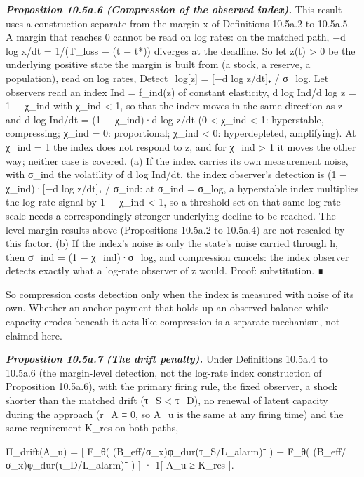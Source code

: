 \documentclass[
]{article}
\begin{document}
\emph{\textbf{Proposition 10.5a.6 (Compression of the observed index).}}
This result uses a construction separate from the margin x of
Definitions 10.5a.2 to 10.5a.5. A margin that reaches 0 cannot be read
on log rates: on the matched path, −d log x/dt = 1/(T\_loss − (t − t*))
diverges at the deadline. So let z(t) \textgreater{} 0 be the underlying
positive state the margin is built from (a stock, a reserve, a
population), read on log rates, Detect\_log{[}z{]} = {[}−d log z/dt{]}₊
/ σ\_log. Let observers read an index Ind = f\_ind(z) of constant
elasticity, d log Ind/d log z = 1 − χ\_ind with χ\_ind \textless{} 1, so
that the index moves in the same direction as z and d log Ind/dt = (1 −
χ\_ind)·d log z/dt (0 \textless{} χ\_ind \textless{} 1: hyperstable,
compressing; χ\_ind = 0: proportional; χ\_ind \textless{} 0:
hyperdepleted, amplifying). At χ\_ind = 1 the index does not respond to
z, and for χ\_ind \textgreater{} 1 it moves the other way; neither case
is covered. (a) If the index carries its own measurement noise, with
σ\_ind the volatility of d log Ind/dt, the index observer's detection is
(1 − χ\_ind)·{[}−d log z/dt{]}₊ / σ\_ind: at σ\_ind = σ\_log, a
hyperstable index multiplies the log-rate signal by 1 − χ\_ind
\textless{} 1, so a threshold set on that same log-rate scale needs a
correspondingly stronger underlying decline to be reached. The
level-margin results above (Propositions 10.5a.2 to 10.5a.4) are not
rescaled by this factor. (b) If the index's noise is only the state's
noise carried through h, then σ\_ind = (1 − χ\_ind)·σ\_log, and
compression cancels: the index observer detects exactly what a log-rate
observer of z would. Proof: substitution. ∎

So compression costs detection only when the index is measured with
noise of its own. Whether an anchor payment that holds up an observed
balance while capacity erodes beneath it acts like compression is a
separate mechanism, not claimed here.

\emph{\textbf{Proposition 10.5a.7 (The drift penalty).}} Under
Definitions 10.5a.4 to 10.5a.6 (the margin-level detection, not the
log-rate index construction of Proposition 10.5a.6), with the primary
firing rule, the fixed observer, a shock shorter than the matched drift
(τ\_S \textless{} τ\_D), no renewal of latent capacity during the
approach (r\_A ≡ 0, so A\_u is the same at any firing time) and the same
requirement K\_res on both paths,

Π\_drift(A\_u) = {[} F\_θ( (B\_eff/σ\_x)φ\_dur(τ\_S/L\_alarm)⁻ ) − F\_θ(
(B\_eff/σ\_x)φ\_dur(τ\_D/L\_alarm)⁻ ) {]} · 1{[} A\_u ≥ K\_res {]}.
\end{document}
